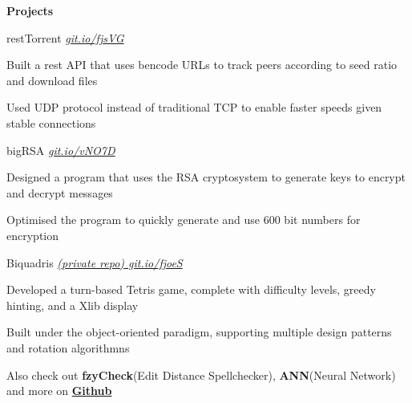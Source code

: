 \documentclass{resume} %
\begin{document}

\begin{rSection}{\textbf{Projects}}
  
	\begin{rSubsection}{restTorrent}
		{\em {\href{https://github.com/MSJawad/restTorrent}
				{git.io/fjsVG}}}
		{}
		
		\item Built a rest API that uses bencode URLs to track peers according to seed ratio and download files
		\item Used UDP protocol instead of traditional TCP to enable faster speeds given stable connections
		
	\end{rSubsection}

  \begin{rSubsection}{bigRSA}
	  {\em {\href{https://github.com/MSJawad/bigRSA}
		    {git.io/vNO7D}}}
	  {}

    \item Designed a program that uses the RSA cryptosystem to generate keys to encrypt and decrypt messages
    \item Optimised the program to quickly generate and use 600 bit numbers for encryption
    
    \end{rSubsection}
    
   \begin{rSubsection}{Biquadris}
	  {\em {\href{https://github.com/MiltonIp/Biquadris}
		    {(private repo) git.io/fjoeS}}}
	  {}

    \item Developed a turn-based Tetris game, complete with difficulty levels, greedy hinting, and a Xlib display
    \item Built under the object{-}oriented paradigm, supporting multiple design patterns and rotation algorithmns
   
    
  \end{rSubsection}

  \begin{rMinisection}
    \item {Also check out}{ \textbf{fzyCheck}(Edit Distance Spellchecker)},
      {\textbf{ANN}(Neural Network)} and more on
      \href{https://github.com/MSJawad}{\textbf{Github}}
  \end{rMinisection}
\end{rSection}
\end{document}
